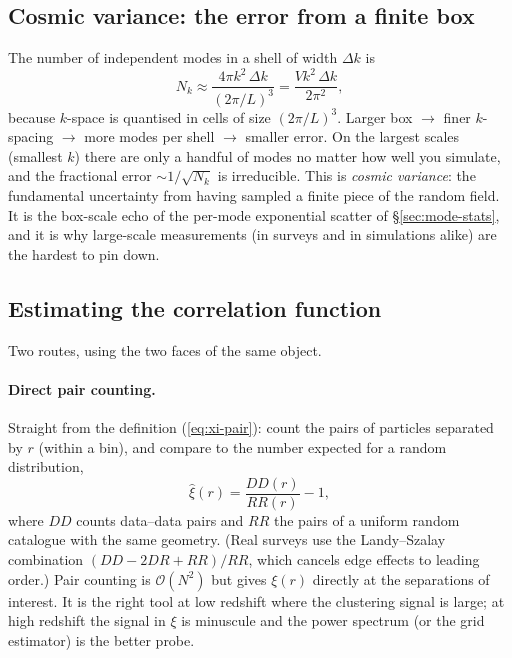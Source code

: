 \documentclass[12pt]{article}
\begin{document}
\subsection{Cosmic variance: the error from a finite box}
\label{sec:cosmicvar}

The number of independent modes in a shell of width $\Delta k$ is
\begin{equation}
  N_k \approx \frac{4\pi k^2\,\Delta k}{(2\pi/L)^3}
            = \frac{V k^2\,\Delta k}{2\pi^2},
\end{equation}
because $k$-space is quantised in cells of size $(2\pi/L)^3$.  Larger box
$\to$ finer $k$-spacing $\to$ more modes per shell $\to$ smaller error.
On the largest scales (smallest $k$) there are only a handful of modes no
matter how well you simulate, and the fractional error $\sim
1/\sqrt{N_k}$ is irreducible.  This is \emph{cosmic variance}: the
fundamental uncertainty from having sampled a finite piece of the random
field.  It is the box-scale echo of the per-mode exponential scatter of
\S\ref{sec:mode-stats}, and it is why large-scale measurements (in
surveys and in simulations alike) are the hardest to pin down.

\subsection{Estimating the correlation function}
\label{sec:estimate-xi}

Two routes, using the two faces of the same object.

\paragraph{Direct pair counting.}  Straight from the definition
(\ref{eq:xi-pair}): count the pairs of particles separated by $r$
(within a bin), and compare to the number expected for a random
distribution,
\begin{equation}
  \hat\xi(r) = \frac{DD(r)}{RR(r)} - 1,
\end{equation}
where $DD$ counts data--data pairs and $RR$ the pairs of a uniform random
catalogue with the same geometry.  (Real surveys use the
Landy--Szalay combination $(DD - 2DR + RR)/RR$, which cancels
edge effects to leading order.)  Pair counting is $\mathcal O(N^2)$ but
gives $\xi(r)$ directly at the separations of interest.  It is the right
tool at low redshift where the clustering signal is large; at high
redshift the signal in $\xi$ is minuscule and the power spectrum (or the
grid estimator) is the better probe.
\end{document}
